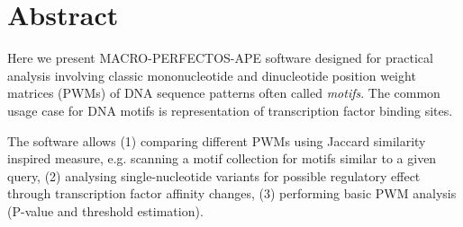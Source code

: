 \section{Abstract}
Here we present MACRO-PERFECTOS-APE software designed for practical analysis involving classic mononucleotide and dinucleotide position weight matrices (PWMs) of DNA sequence patterns often called \textit{motifs}. The common usage case for DNA motifs is representation of transcription factor binding sites.

The software allows (1) comparing different PWMs using Jaccard similarity inspired measure, e.g. scanning a motif collection for motifs similar to a given query, (2) analysing single-nucleotide variants for possible regulatory effect through transcription factor affinity changes, (3) performing basic PWM analysis (P-value and threshold estimation).
